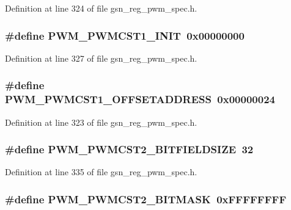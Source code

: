 Definition at line 324 of file gsn\_\-reg\_\-pwm\_\-spec.h.

\hypertarget{a00565_a507fa471c1eb1994c73ac92fed9f2f78}{
\subsubsection[{PWM\_\-PWMCST1\_\-INIT}]{\setlength{\rightskip}{0pt plus 5cm}\#define PWM\_\-PWMCST1\_\-INIT~0x00000000}}
\label{a00565_a507fa471c1eb1994c73ac92fed9f2f78}


Definition at line 327 of file gsn\_\-reg\_\-pwm\_\-spec.h.

\hypertarget{a00565_a34f4aa6de9713fc2060a47ae9bbbf0fd}{
\subsubsection[{PWM\_\-PWMCST1\_\-OFFSETADDRESS}]{\setlength{\rightskip}{0pt plus 5cm}\#define PWM\_\-PWMCST1\_\-OFFSETADDRESS~0x00000024}}
\label{a00565_a34f4aa6de9713fc2060a47ae9bbbf0fd}


Definition at line 323 of file gsn\_\-reg\_\-pwm\_\-spec.h.

\hypertarget{a00565_ace5f322318efae3c8fdbc8140f82cdd3}{
\subsubsection[{PWM\_\-PWMCST2\_\-BITFIELDSIZE}]{\setlength{\rightskip}{0pt plus 5cm}\#define PWM\_\-PWMCST2\_\-BITFIELDSIZE~32}}
\label{a00565_ace5f322318efae3c8fdbc8140f82cdd3}


Definition at line 335 of file gsn\_\-reg\_\-pwm\_\-spec.h.

\hypertarget{a00565_aadf5c28e1c542f508c1997683c5f0179}{
\subsubsection[{PWM\_\-PWMCST2\_\-BITMASK}]{\setlength{\rightskip}{0pt plus 5cm}\#define PWM\_\-PWMCST2\_\-BITMASK~0xFFFFFFFF}}
\label{a00565_aadf5c28e1c542f508c1997683c5f0179}


